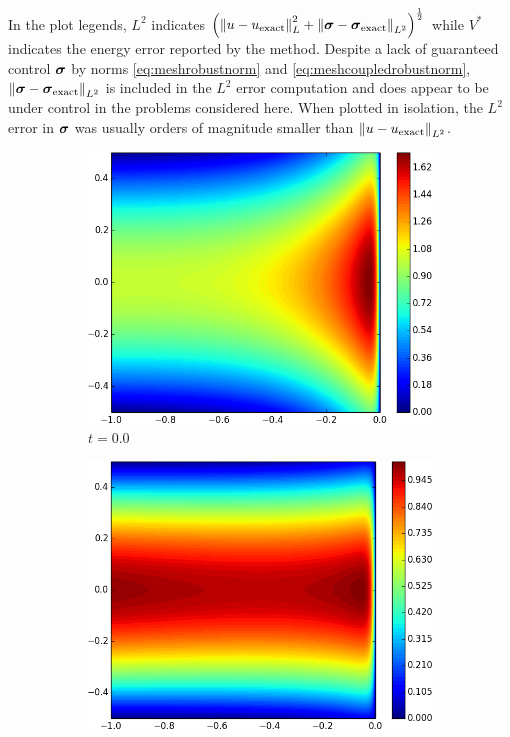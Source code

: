\documentclass{article}
\theoremstyle{definition}
\theoremstyle{remark}
\begin{document}
In the plot legends, $L^2$ indicates $\left( \left\| u-u_\text{exact} \right\|_L^2+\left\| \boldsymbol\sigma-\boldsymbol\sigma_\text{exact} \right\|_{L^2} \right)^{\frac{1}{2}}$ 
while $V^*$ indicates the energy error reported by the method.
Despite a lack of guaranteed control $\boldsymbol\sigma$ by norms \eqref{eq:meshrobustnorm} and \eqref{eq:meshcoupledrobustnorm},
$\left\| \boldsymbol\sigma-\boldsymbol\sigma_\text{exact} \right\|_{L^2}$ is included in the $L^2$ error computation and does appear to be under control in the problems 
considered here. When plotted in isolation, the $L^2$ error in $\boldsymbol\sigma$ was usually orders of magnitude smaller than $\left\| u-u_\text{exact} \right\|_{L^2}$.

\begin{figure}[ht]
\centering
\begin{subfigure}[t]{0.32\textwidth}
\centering
\includegraphics[width=\textwidth]{Confusion/Robustness/2d_problem_t_=_00.png}
\caption{$t=0.0$}
\end{subfigure}
\begin{subfigure}[t]{0.32\textwidth}
\centering
\includegraphics[width=\textwidth]{Confusion/Robustness/2d_problem_t_=_05.png}

\end{subfigure}
\end{figure}
\end{document}
